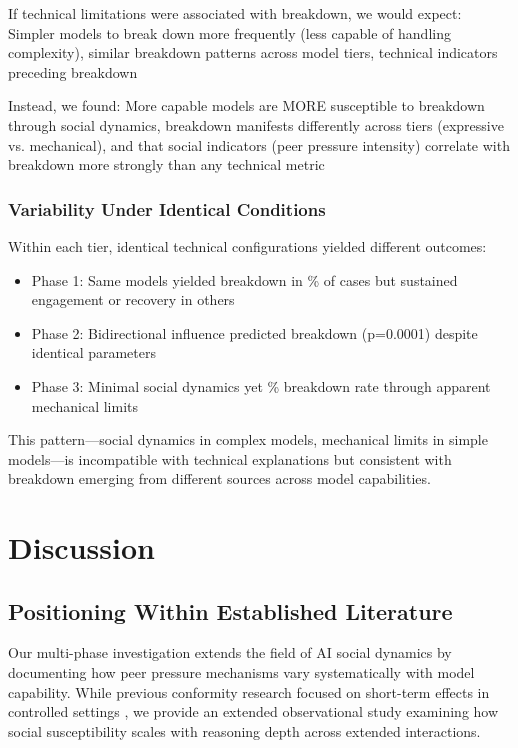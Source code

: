 \documentclass[11pt,letterpaper]{article}
\newcommand{\exponedataTotalSessionsRaw}{67}
\newcommand{\exponedataBreakdownSessionsRaw}{37}
\newcommand{\exponedataBreakdownPercentage}{%
  \fpeval{round(\exponedataBreakdownSessionsRaw / \exponedataTotalSessionsRaw * 100, 1)}\%
}
\newcommand{\exptwoBidirectionalPValue}{p=0.0001}
\newcommand{\expthreeTotalSessionsRaw}{100}
\newcommand{\expthreeBreakdownSessionsRaw}{19}
\newcommand{\expthreeBreakdownPercentage}{%
  \fpeval{round(\expthreeBreakdownSessionsRaw / \expthreeTotalSessionsRaw * 100, 1)}\%
}
\begin{document}
If technical limitations were associated with breakdown, we would expect: Simpler models to break down more frequently (less capable of handling complexity), similar breakdown patterns across model tiers, technical indicators preceding breakdown

Instead, we found: More capable models are MORE susceptible to breakdown through social dynamics, breakdown manifests differently across tiers (expressive vs. mechanical), and that social indicators (peer pressure intensity) correlate with breakdown more strongly than any technical metric

\subsubsection{Variability Under Identical Conditions}

Within each tier, identical technical configurations yielded different outcomes:
\begin{itemize}
    \item Phase 1: Same models yielded breakdown in \exponedataBreakdownPercentage{} of cases but sustained engagement or recovery in others
    \item Phase 2: Bidirectional influence predicted breakdown (\exptwoBidirectionalPValue{}) despite identical parameters
    \item Phase 3: Minimal social dynamics yet \expthreeBreakdownPercentage{} breakdown rate through apparent mechanical limits
\end{itemize}

This pattern—social dynamics in complex models, mechanical limits in simple models—is incompatible with technical explanations but consistent with breakdown emerging from different sources across model capabilities.


\section{Discussion}

\subsection{Positioning Within Established Literature}

Our multi-phase investigation extends the field of AI social dynamics by documenting how peer pressure mechanisms vary systematically with model capability. While previous conformity research focused on short-term effects in controlled settings \citep{kyrlitsias2018conformity}, we provide an extended observational study examining how social susceptibility scales with reasoning depth across extended interactions.
\end{document}
